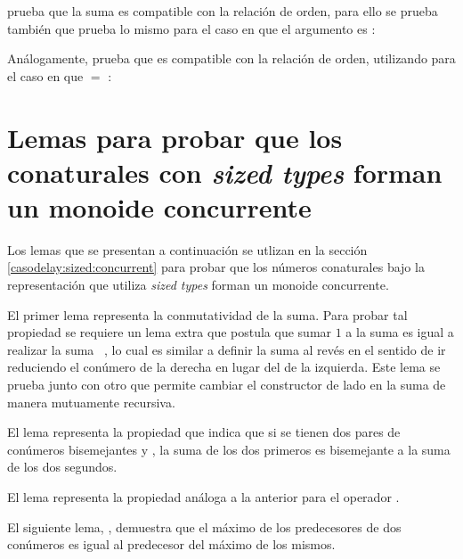  prueba que la suma es compatible con la relación de orden, para ello se prueba también  que prueba lo mismo para el caso en que el argumento  es :

Análogamente,  prueba que  es compatible con la relación de orden, utilizando  para el caso en que  $=$ :

\section{Lemas para probar que los conaturales con \textit{sized types} forman un monoide concurrente}\label{apendice:lemassz}

Los lemas que se presentan a continuación se utlizan en la sección \ref{casodelay:sized:concurrent} para probar que los números conaturales bajo la representación que utiliza \textit{sized types} forman un monoide concurrente.

El primer lema representa la conmutatividad de la suma. Para probar tal propiedad se requiere un lema extra que postula que sumar $1$ a la suma  \AgdaFunction{+}   es igual a realizar la suma \hbox{ \AgdaFunction{+}  }, lo cual es similar a definir la suma al revés en el sentido de ir reduciendo el conúmero de la derecha en lugar del de la izquierda. Este lema se prueba junto con otro que permite cambiar el constructor  de lado en la suma de manera mutuamente recursiva.

El lema  representa la propiedad que indica que si se tienen dos pares de conúmeros bisemejantes  \AgdaFunction{$\sim$}  y  \AgdaFunction{$\sim$} , la suma de los dos primeros es bisemejante a la suma de los dos segundos.

El lema  representa la propiedad análoga a la anterior para el operador .

El siguiente lema, , demuestra que el máximo de los predecesores de dos conúmeros es igual al predecesor del máximo de los mismos.
